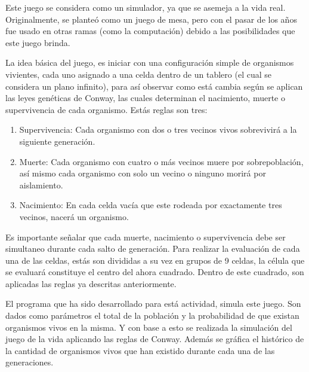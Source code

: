 	Este juego se considera como un simulador, ya que se asemeja a la vida real. Originalmente, se planteó como un juego de mesa, pero con el pasar de los años fue usado en otras ramas (como la computación) debido a las posibilidades que este juego brinda.

	La idea básica del juego, es iniciar con una configuración simple de organismos vivientes, cada uno asignado a una celda dentro de un tablero (el cual se considera un plano infinito), para así observar como está cambia según se aplican las leyes genéticas de Conway, las cuales determinan el nacimiento, muerte o supervivencia de cada organismo. Estás reglas son tres:
	\begin{enumerate}
		\item Supervivencia: Cada organismo con dos o tres vecinos vivos sobrevivirá a la siguiente generación.
		\item Muerte: Cada organismo con cuatro o más vecinos muere por sobrepoblación, así mismo cada organismo con solo un vecino o ninguno morirá por aislamiento.
		\item Nacimiento: En cada celda vacía que este rodeada por exactamente tres vecinos, nacerá un organismo. \cite{web}
	\end{enumerate}

	Es importante señalar que cada muerte, nacimiento o supervivencia debe ser simultaneo durante cada salto de generación.
	Para realizar la evaluación de cada una de las celdas, estás son divididas a su vez en grupos de 9 celdas, la célula que se evaluará constituye el centro del ahora cuadrado. Dentro de este cuadrado, son aplicadas las reglas ya descritas anteriormente.

	El programa que ha sido desarrollado para está actividad, simula este juego. Son dados como parámetros el total de la población y la probabilidad de que existan organismos vivos en la misma. Y con base a esto se realizada la simulación del juego de la vida aplicando las reglas de Conway. Además se gráfica el histórico de la cantidad de organismos vivos que han existido durante cada una de las generaciones.
	
